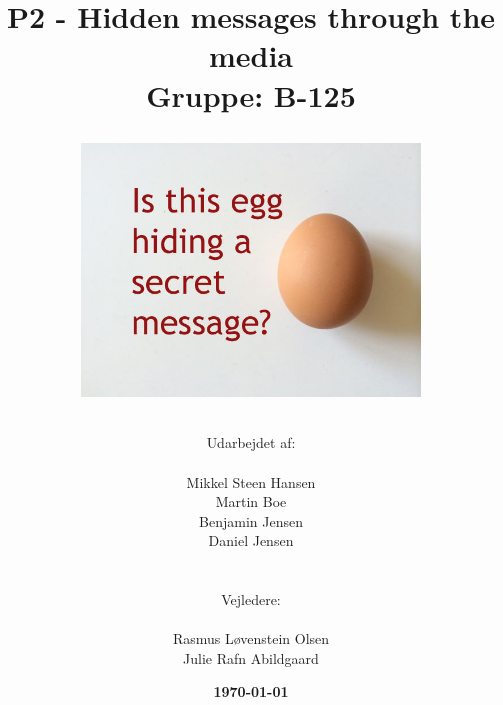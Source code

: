 \documentclass[11pt]{article}
\title{
    P2 - Hidden messages through the media 
    \\ 
    Gruppe: B-125
    \\
    \begin{figure}[!h]
        \centering
        \includegraphics[width=0.8\textwidth, angle =0]{Projectdoc/Egg-Message.jpg}
        \label{fig:FrontPage}
    \end{figure}
}
\author{
    Udarbejdet af:\\
    \\
    Mikkel Steen Hansen\\
    Martin Boe\\
    Benjamin Jensen\\
    Daniel Jensen\\
    \\\\
    Vejledere:\\ 
    \\
    Rasmus Løvenstein Olsen\\
    Julie Rafn Abildgaard\\
}
\date{\textbf{\today}}
\renewcommand{\baselinestretch}{1.20}
\begin{document}
    \begin{titlepage}
        \clearpage
        \maketitle
        \thispagestyle{empty}
    \end{titlepage}
    
    
    
    \renewcommand{\baselinestretch}{0.8} 
    \tableofcontents
    \renewcommand{\baselinestretch}{1.20} 
    \newpage
    

    
    
    
    
    
    
    
    \newpage
    
    
    
\end{document}
